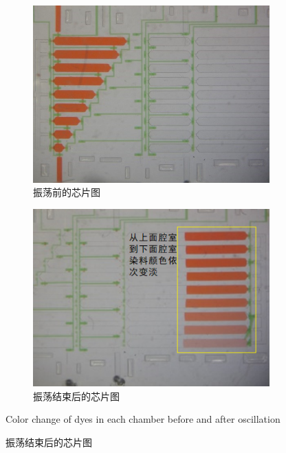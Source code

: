 	\begin{figure}[!thp]
	\centering
	  \begin{subfigure}{0.45\textwidth}
		\centering
		\includegraphics[width=1\linewidth]{figure/chap2/before.jpg}
		\caption{振荡前的芯片图 }
		\label{fig:before}   
	  \end{subfigure}
		\hspace{1em}
	  \begin{subfigure}{0.45\textwidth}
		\centering
		\includegraphics[width=1\linewidth]{figure/chap2/after.png}
		\caption{振荡结束后的芯片图}
		\label{fig:after}
	  \end{subfigure}
	  {Color change of dyes in each chamber before and after oscillation}
	  \label{fig:oscillation}
	\end{figure}

